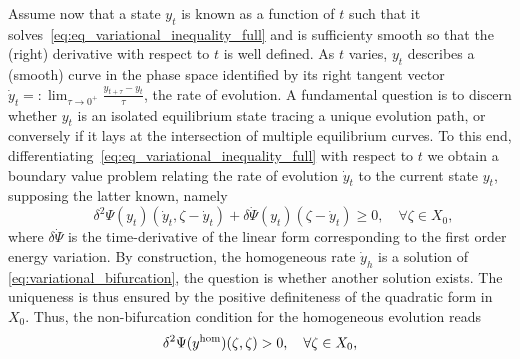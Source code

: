 Assume now that a state $y_t$ is known as a function of $t$ such that it solves~\eqref{eq:eq_variational_inequality_full} and is sufficienty smooth so that the (right) derivative with respect to $t$ is well defined. 
As $t$ varies, $y_t$ describes a (smooth) curve in the phase space identified by its right tangent vector $\dot y_t =: \lim_{\tau\to 0^+}\frac{y_{t+\tau} - y_t}{\tau}$, the rate of evolution.
A fundamental question is to discern whether $y_t$ is an isolated equilibrium state tracing a unique evolution path, or conversely if it lays at the intersection of multiple equilibrium curves.
To this end, differentiating~\eqref{eq:eq_variational_inequality_full} with respect to $t$ we  obtain a boundary value problem relating the rate of evolution $\dot y_t$ to the current state $y_t$, supposing the latter known, namely
% 
\begin{equation}
    \label{eq:variational_bifurcation}
    \qquad \delta^2 \Psi(y_t)(\dot y_t,   \zeta -\dot y_t) + \delta \dot \Psi(y_t)(\zeta-\dot y_t) \geq 0, \quad \forall \zeta\in X_{0},
\end{equation}
where $\delta \dot \Psi$ is the time-derivative of the linear form corresponding to the first order energy variation.
By construction, the homogeneous rate $\dot y_h$ is a solution of \eqref{eq:variational_bifurcation}, the question is whether another solution exists. The uniqueness is thus ensured by the positive definiteness of the quadratic form 
in $X_0$. 
Thus, the non-bifurcation condition for the homogeneous evolution reads
\begin{equation}
    \label{eq:bifurcation_uniqueness}
    \delta^2 \Psi(y^{\text{hom}})(\zeta, \zeta) > 0, \quad \forall \zeta \in X_0,
\end{equation}
